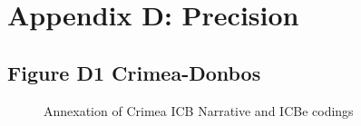 \documentclass{article}
\begin{document}
\hypertarget{appendix-d-precision}{%
\section{Appendix D: Precision}\label{appendix-d-precision}}

\hypertarget{figure-d1-crimea-donbos}{%
\subsection{Figure D1 Crimea-Donbos}\label{figure-d1-crimea-donbos}}

\hphantom{em}

\begin{figure}[H]
\caption{ Annexation of Crimea ICB Narrative and ICBe codings \label{fig:case_study_crimea_precision}}
\end{figure}
\clearpage
\end{document}

